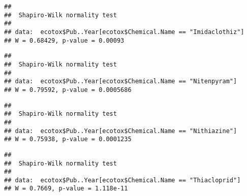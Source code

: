 \documentclass[]{article}
\newenvironment{Shaded}{\begin{snugshade}}{\end{snugshade}}
\newcommand{\KeywordTok}[1]{\textcolor[rgb]{0.13,0.29,0.53}{\textbf{#1}}}
\newcommand{\StringTok}[1]{\textcolor[rgb]{0.31,0.60,0.02}{#1}}
\newcommand{\OperatorTok}[1]{\textcolor[rgb]{0.81,0.36,0.00}{\textbf{#1}}}
\newcommand{\NormalTok}[1]{#1}
\begin{document}
\begin{verbatim}
## 
##  Shapiro-Wilk normality test
## 
## data:  ecotox$Pub..Year[ecotox$Chemical.Name == "Imidaclothiz"]
## W = 0.68429, p-value = 0.00093
\end{verbatim}

\begin{Shaded}
\end{Shaded}

\begin{verbatim}
## 
##  Shapiro-Wilk normality test
## 
## data:  ecotox$Pub..Year[ecotox$Chemical.Name == "Nitenpyram"]
## W = 0.79592, p-value = 0.0005686
\end{verbatim}

\begin{Shaded}
\end{Shaded}

\begin{verbatim}
## 
##  Shapiro-Wilk normality test
## 
## data:  ecotox$Pub..Year[ecotox$Chemical.Name == "Nithiazine"]
## W = 0.75938, p-value = 0.0001235
\end{verbatim}

\begin{Shaded}
\end{Shaded}

\begin{verbatim}
## 
##  Shapiro-Wilk normality test
## 
## data:  ecotox$Pub..Year[ecotox$Chemical.Name == "Thiacloprid"]
## W = 0.7669, p-value = 1.118e-11
\end{verbatim}

\begin{Shaded}
\end{Shaded}
\end{document}
